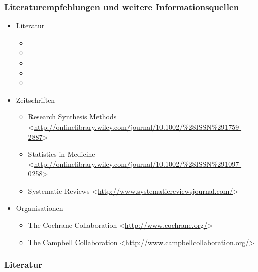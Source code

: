 \begin{frame}[allowframebreaks]\frametitle{Literaturempfehlungen und weitere Informationsquellen}

  \begin{footnotesize}
    \begin{itemize}
    \item Literatur
      \begin{itemize}
      \item {}
      \item {}
      \item {}
      \item {}
      \item {}
      \end{itemize}
    \item Zeitschriften
      \begin{itemize}
      \item Research Synthesis Methods
        <\url{http://onlinelibrary.wiley.com/journal/10.1002/\%28ISSN\%291759-2887}>
      \item Statistics in Medicine
        <\url{http://onlinelibrary.wiley.com/journal/10.1002/\%28ISSN\%291097-0258}>
      \item Systematic Reviews <\url{http://www.systematicreviewsjournal.com/}>
      \end{itemize}
    \item Organisationen
      \begin{itemize}
      \item The Cochrane Collaboration <\url{http://www.cochrane.org/}>
      \item The Campbell Collaboration
        <\url{http://www.campbellcollaboration.org/}>
      \end{itemize}
    \end{itemize}
  \end{footnotesize}
\end{frame}

\renewcommand{\bibfont}{\normalfont\tiny}
\begin{frame}\frametitle{Literatur}
\printbibliography
\end{frame}




